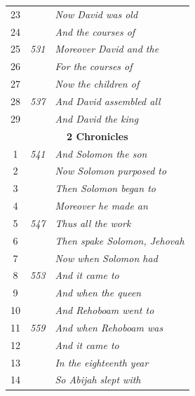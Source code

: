 \documentclass{article}
\newlength{\minipageheight}
\newlength{\minipagewidth}
\begin{document}
\begin{minipage}[r][\minipageheight][t]{\minipagewidth}
\begin{longtable}{ccl}
        23          &              & \textit{Now David was old}           \\
        24          &              & \textit{And the courses of}          \\
        25          & \textit{531} & \textit{Moreover David and the}      \\
        26          &              & \textit{For the courses of}          \\
        27          &              & \textit{Now the children of}         \\
        28          & \textit{537} & \textit{And David assembled all}     \\
        29          &              & \textit{And David the king}          \\

        \multicolumn{3}{c}{\textbf{2 Chronicles}}                         \\
        \hline
        1           & \textit{541} & \textit{And Solomon the son}         \\
        2           &              & \textit{Now Solomon purposed to}     \\
        3           &              & \textit{Then Solomon began to}       \\
        4           &              & \textit{Moreover he made an}         \\
        5           & \textit{547} & \textit{Thus all the work}           \\
        6           &              & \textit{Then spake Solomon, Jehovah} \\
        7           &              & \textit{Now when Solomon had}        \\
        8           & \textit{553} & \textit{And it came to}              \\
        9           &              & \textit{And when the queen}          \\
        10          &              & \textit{And Rehoboam went to}        \\
        11          & \textit{559} & \textit{And when Rehoboam was}       \\
        12          &              & \textit{And it came to}              \\
        13          &              & \textit{In the eighteenth year}      \\
        14          &              & \textit{So Abijah slept with}        \\

\end{longtable}
\end{minipage}
\end{document}
